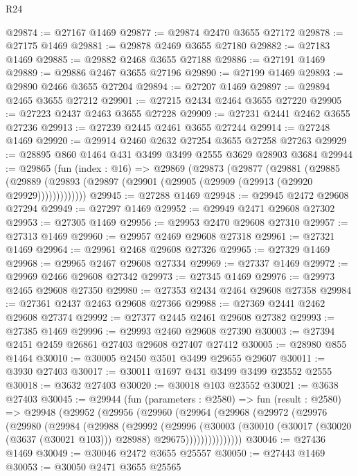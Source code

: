 \begin{lexlean}{R24}
\begin{coremodule}
@29874 := @27167 @1469
@29877 := @29874 @2470 @3655 @27172
@29878 := @27175 @1469
@29881 := @29878 @2469 @3655 @27180
@29882 := @27183 @1469
@29885 := @29882 @2468 @3655 @27188
@29886 := @27191 @1469
@29889 := @29886 @2467 @3655 @27196
@29890 := @27199 @1469
@29893 := @29890 @2466 @3655 @27204
@29894 := @27207 @1469
@29897 := @29894 @2465 @3655 @27212
@29901 := @27215 @2434 @2464 @3655 @27220
@29905 := @27223 @2437 @2463 @3655 @27228
@29909 := @27231 @2441 @2462 @3655 @27236
@29913 := @27239 @2445 @2461 @3655 @27244
@29914 := @27248 @1469
@29920 := @29914 @2460 @2632 @27254 @3655 @27258 @27263
@29929 := @28895 @860 @1464 @431 @3499 @3499 @2555 @3629 @28903 @3684
@29944 := @29865
    (fun (index : @16) =>
    @29869
      (@29873
        (@29877
          (@29881
            (@29885
              (@29889 (@29893 (@29897 (@29901 (@29905 (@29909 (@29913 (@29920 @29929)))))))))))))
@29945 := @27288 @1469
@29948 := @29945 @2472 @29608 @27294
@29949 := @27297 @1469
@29952 := @29949 @2471 @29608 @27302
@29953 := @27305 @1469
@29956 := @29953 @2470 @29608 @27310
@29957 := @27313 @1469
@29960 := @29957 @2469 @29608 @27318
@29961 := @27321 @1469
@29964 := @29961 @2468 @29608 @27326
@29965 := @27329 @1469
@29968 := @29965 @2467 @29608 @27334
@29969 := @27337 @1469
@29972 := @29969 @2466 @29608 @27342
@29973 := @27345 @1469
@29976 := @29973 @2465 @29608 @27350
@29980 := @27353 @2434 @2464 @29608 @27358
@29984 := @27361 @2437 @2463 @29608 @27366
@29988 := @27369 @2441 @2462 @29608 @27374
@29992 := @27377 @2445 @2461 @29608 @27382
@29993 := @27385 @1469
@29996 := @29993 @2460 @29608 @27390
@30003 := @27394 @2451 @2459 @26861 @27403 @29608 @27407 @27412
@30005 := @28980 @855 @1464
@30010 := @30005 @2450 @3501 @3499 @29655 @29607
@30011 := @3930 @27403
@30017 := @30011 @1697 @431 @3499 @3499 @23552 @2555
@30018 := @3632 @27403
@30020 := @30018 @103 @23552
@30021 := @3638 @27403
@30045 := @29944
    (fun (parameters : @2580) =>
    fun (result : @2580) =>
    @29948
      (@29952
        (@29956
          (@29960
            (@29964
              (@29968
                (@29972
                  (@29976
                    (@29980
                      (@29984
                        (@29988
                          (@29992
                            (@29996
                              (@30003
                                (@30010
                                  (@30017 (@30020 (@3637 (@30021 @103))) @28988)
                                  @29675)))))))))))))))
@30046 := @27436 @1469
@30049 := @30046 @2472 @3655 @25557
@30050 := @27443 @1469
@30053 := @30050 @2471 @3655 @25565

\end{coremodule}
\end{lexlean}
